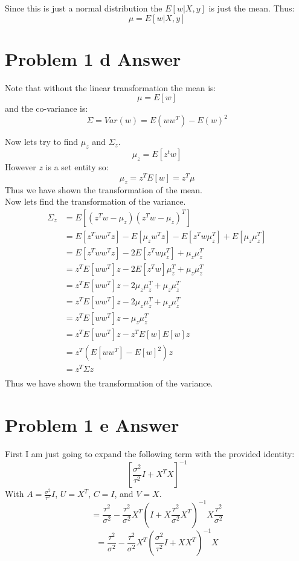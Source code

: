 \documentclass{article}
\newcommand{\1}{\mathbf{1}}
\begin{document}
Since this is just a normal distribution the $E[w|X,y]$ is just the mean. Thus:
$$ \mu = E[w|X,y] $$

\section*{Problem 1 d Answer}
Note that without the linear transformation the mean is: 
$$\mu = E[w]$$
and the co-variance is: 
$$ \Sigma =  Var(w) = E(ww^T) - E(w)^2$$

Now lets try to find $\mu_z$ and $\Sigma_z$.
$$ \mu_z = E[z^t w] $$
However $z$ is a set entity so:
$$ \mu_z = z^T E[w] = z^T \mu $$
Thus we have shown the transformation of the mean. \\

Now lets find the transformation of the variance. \\
\begin{align}
    \Sigma_z & = E[(z^Tw-\mu_z )(z^Tw-\mu_z)^T ] \\
    & = E[z^T w w^T z ] - E[ \mu_z w^T z ] - E[z^T w \mu_z^T ] + E[\mu_z \mu_z^T ] \\
    & = E[z^T w w^T z ] - 2  E[z^T w \mu_z^T ] +  \mu_z \mu_z^T  \\
    & = z^T E[ w w^T  ] z - 2  E[z^T w] \mu_z^T +  \mu_z \mu_z^T  \\
    & = z^T E[ w w^T  ] z - 2  \mu_z  \mu_z^T +  \mu_z \mu_z^T  \\
    & = z^T E[ w w^T  ] z - 2  \mu_z  \mu_z^T +  \mu_z \mu_z^T  \\
    & = z^T E[ w w^T  ] z -  \mu_z \mu_z^T  \\
    & = z^T E[ w w^T  ] z -  z^T E[w] E[w] z  \\
    & = z^T ( E[ w w^T  ] - E[w]^2 ) z  \\
    & = z^T \Sigma  z  \\
\end{align}
Thus we have shown the transformation of the variance. \\



\section*{Problem 1 e Answer}

First I am just going to expand the following term with the provided identity:
$$ [ \frac{\sigma^2}{\tau^2} I +X^T X ]^{-1}  $$
With $A=\frac{\sigma^2}{\tau^2} I $, $U=X^T$, $C=I$, and $V=X$. 
$$ =  \frac{\tau^2}{\sigma^2} - \frac{\tau^2}{\sigma^2} X^T( I + X \frac{\tau^2}{\sigma^2} X^T )^{-1} X \frac{\tau^2}{\sigma^2}   $$
$$ =  \frac{\tau^2}{\sigma^2} - \frac{\tau^2}{\sigma^2} X^T( \frac{\sigma^2}{\tau^2} I + X X^T )^{-1} X    $$
\end{document}
